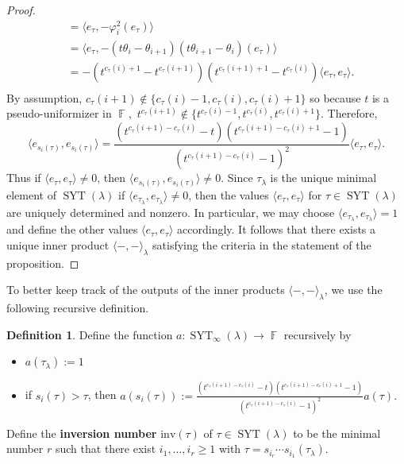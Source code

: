 \documentclass[12pt,reqno]{amsart}
\theoremstyle{definition}
\newtheorem{defn}[thm]{Definition}
\DeclareMathOperator{\bF}{\mathbb{F}}
\DeclareMathOperator{\SYT}{\mathrm{SYT}}
\begin{document}
\begin{proof}
\begin{align*}
        &= \langle e_{\tau}, -\varphi_i^2(e_{\tau}) \rangle\\
        &= \langle e_{\tau}, -(t\theta_{i}-\theta_{i+1})(t\theta_{i+1}-\theta_{i})(e_{\tau}) \rangle \\
        &= -(t^{c_{\tau}(i)+1}-t^{c_{\tau}(i+1)})(t^{c_{\tau}(i+1)+1}-t^{c_{\tau}(i)})\langle e_{\tau}, e_{\tau} \rangle.\\ 
    \end{align*}
By assumption, $c_{\tau}(i+1) \notin \{c_{\tau}(i)-1 ,c_{\tau}(i), c_{\tau}(i)+1\}$ so because $t$ is a pseudo-uniformizer in $\bF,$ $t^{c_{\tau}(i+1)}  \notin \{ t^{c_{\tau}(i)-1}, t^{c_{\tau}(i)}, t^{c_{\tau}(i)+1} \}.$ Therefore, 
$$\langle e_{s_{i}(\tau)},e_{s_{i}(\tau)} \rangle = \frac{(t^{c_{\tau}(i+1)- c_{\tau}(i)}-t)(t^{c_{\tau}(i+1)- c_{\tau}(i)+1}-1)}{(t^{c_{\tau}(i+1)- c_{\tau}(i)}-1)^2}\langle e_{\tau},e_{\tau} \rangle.$$ Thus if $\langle e_{\tau},e_{\tau} \rangle \neq 0$, then $\langle e_{s_{i}(\tau)},e_{s_{i}(\tau)} \rangle \neq 0.$ Since $\tau_{\lambda}$ is the unique minimal element of $\SYT(\lambda)$ if $\langle e_{\tau_{\lambda}}, e_{\tau_{\lambda}} \rangle  \neq 0$, then the values $\langle e_{\tau}, e_{\tau} \rangle$  for $\tau \in \SYT(\lambda)$ are uniquely determined and nonzero. In particular, we may choose $\langle e_{\tau_{\lambda}}, e_{\tau_{\lambda}}\rangle = 1$ and define the other values $\langle e_{\tau}, e_{\tau}\rangle$ accordingly. It follows that there exists a unique inner product $\langle - , -\rangle_{\lambda}$ satisfying the criteria in the statement of the proposition. 
\end{proof}

To better keep track of the outputs of the inner products $\langle-,-\rangle_{\lambda}$, we use the following recursive definition. 

\begin{defn}
    Define the function $a: \SYT_{\infty}(\lambda) \rightarrow \bF$ recursively by 
    \begin{itemize}
        \item $a(\tau_{\lambda}):= 1$
        \item if $s_i(\tau) > \tau$, then 
        $a(s_i(\tau)):= \frac{(t^{c_{\tau}(i+1)- c_{\tau}(i)}-t)(t^{c_{\tau}(i+1)- c_{\tau}(i)+1}-1)}{(t^{c_{\tau}(i+1)- c_{\tau}(i)}-1)^2} a(\tau).$
    \end{itemize}
    Define the \textbf{inversion number} $\mathrm{inv}(\tau)$ of $\tau \in \SYT(\lambda)$ to be the minimal number $r$ such that there exist $i_1,\dots,i_r \geq 1$ with $\tau = s_{i_r}\cdots s_{i_1}(\tau_{\lambda}).$ 
\end{defn}
\end{document}
